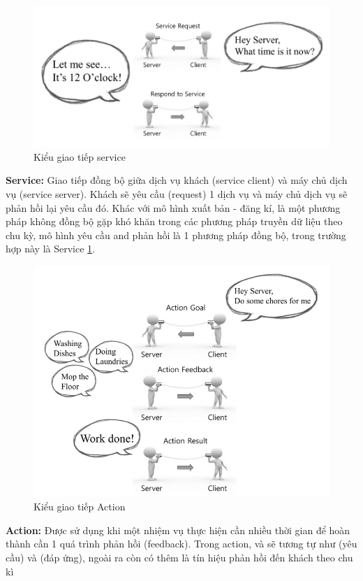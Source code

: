 {\begin{figure}[htbp]
  \centering
  \includegraphics[width=0.9\linewidth]{figures/service.png}
  \caption{Kiểu giao tiếp service}
  \label{fig:service}
\end{figure}
\textbf{Service: } Giao tiếp đồng bộ giữa dịch vụ khách (service client) và máy chủ dịch vụ (service server). Khách sẽ yêu cầu (request) 1 dịch vụ và máy chủ dịch vụ sẽ phản hồi lại yêu cầu đó. Khác với mô hình xuất bản - đăng kí, là một phương pháp không đồng bộ gặp khó khăn trong các phương pháp truyền dữ liệu theo chu kỳ, mô hình yêu cầu and phản hồi là 1 phương pháp đồng bộ, trong trường hợp này là Service \figurename{ \ref{fig:service}}.

\begin{figure}[htbp]
  \centering
  \includegraphics[width=0.8\linewidth]{figures/action.png}
  \caption{Kiểu giao tiếp Action}
  \label{fig:action}
\end{figure}
\textbf{Action:} Được sử dụng khi một nhiệm vụ thực hiện cần nhiều thời gian để hoàn thành cần 1 quá trình phản hồi (feedback). Trong action,  và  sẽ tương tự như  (yêu cầu) và (đáp ứng), ngoài ra còn có thêm  là tín hiệu phản hồi đến khách theo chu kì


}
